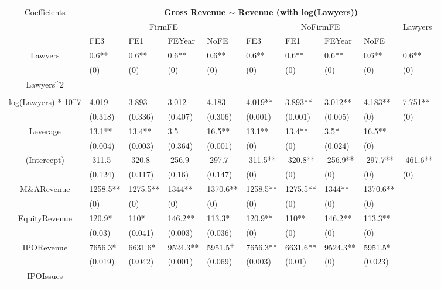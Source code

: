\documentclass{article}
\begin{document}
\begin{table}[H]
\centering
\begin{tabular}{|clllllllll|}
\hline
\multirow{3}{*}{Coefficients} & \multicolumn{9}{c|}{\textbf{Gross Revenue $\sim$ Revenue (with log(Lawyers))}} \\
\cline{2-10}
& \multicolumn{4}{c}{FirmFE} & \multicolumn{4}{c}{NoFirmFE} & \multirow{2}{*}{Lawyers} \\
\cline{2-9}
& FE3 & FE1 & FEYear & NoFE & FE3 & FE1 & FEYear & NoFE &  \\
\hline
 
Lawyers & 0.6** & 0.6** & 0.6** & 0.6** & 0.6** & 0.6** & 0.6** & 0.6** & 0.6** \\ 
   & (0) & (0) & (0) & (0) & (0) & (0) & (0) & (0) & (0) \\ 
  Lawyers^2 &  &  &  &  &  &  &  &  &  \\ 
   &  &  &  &  &  &  &  &  &  \\ 
  log(Lawyers) * 10^7 & 4.019 & 3.893 & 3.012 & 4.183 & 4.019** & 3.893** & 3.012** & 4.183** & 7.751** \\ 
   & (0.318) & (0.336) & (0.407) & (0.306) & (0.001) & (0.001) & (0.005) & (0) & (0) \\ 
  Leverage & 13.1** & 13.4** & 3.5 & 16.5** & 13.1** & 13.4** & 3.5* & 16.5** &  \\ 
   & (0.004) & (0.003) & (0.364) & (0.001) & (0) & (0) & (0.024) & (0) &  \\ 
  (Intercept) & -311.5 & -320.8 & -256.9 & -297.7 & -311.5** & -320.8** & -256.9** & -297.7** & -461.6** \\ 
   & (0.124) & (0.117) & (0.16) & (0.147) & (0) & (0) & (0) & (0) & (0) \\ 
  M\&ARevenue & 1258.5** & 1275.5** & 1344** & 1370.6** & 1258.5** & 1275.5** & 1344** & 1370.6** &  \\ 
   & (0) & (0) & (0) & (0) & (0) & (0) & (0) & (0) &  \\ 
  EquityRevenue & 120.9* & 110* & 146.2** & 113.3* & 120.9** & 110** & 146.2** & 113.3** &  \\ 
   & (0.03) & (0.041) & (0.003) & (0.036) & (0) & (0) & (0) & (0) &  \\ 
  IPORevenue & 7656.3* & 6631.6* & 9524.3** & 5951.5$^{+}$ & 7656.3** & 6631.6** & 9524.3** & 5951.5* &  \\ 
   & (0.019) & (0.042) & (0.001) & (0.069) & (0.003) & (0.01) & (0) & (0.023) &  \\ 
  IPOIssues &  &  &  &  &  &  &  &  &  \\ 

\end{tabular}
\end{table}
\end{document}
